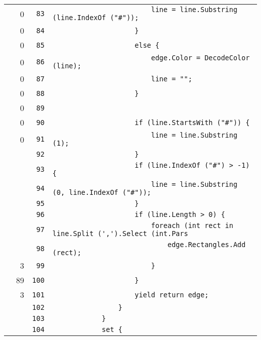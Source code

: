 \documentclass[a4paper,10pt]{article}
\begin{document}
\begin{longtable}[l]{lrrl}
\cellcolor{red} & 0 & \verb~83~ & \verb~                        line = line.Substring (line.IndexOf ("#"));~\\
\cellcolor{red} & 0 & \verb~84~ & \verb~                    }~\\
\cellcolor{red} & 0 & \verb~85~ & \verb~                    else {~\\
\cellcolor{red} & 0 & \verb~86~ & \verb~                        edge.Color = DecodeColor (line);~\\
\cellcolor{red} & 0 & \verb~87~ & \verb~                        line = "";~\\
\cellcolor{red} & 0 & \verb~88~ & \verb~                    }~\\
\cellcolor{red} & 0 & \verb~89~ & \verb~~\\
\cellcolor{red} & 0 & \verb~90~ & \verb~                    if (line.StartsWith ("#")) {~\\
\cellcolor{red} & 0 & \verb~91~ & \verb~                        line = line.Substring (1);~\\
\cellcolor{gray} &  & \verb~92~ & \verb~                    }~\\
\cellcolor{gray} &  & \verb~93~ & \verb~                    if (line.IndexOf ("#") > -1) {~\\
\cellcolor{gray} &  & \verb~94~ & \verb~                        line = line.Substring (0, line.IndexOf ("#"));~\\
\cellcolor{gray} &  & \verb~95~ & \verb~                    }~\\
\cellcolor{gray} &  & \verb~96~ & \verb~                    if (line.Length > 0) {~\\
\cellcolor{gray} &  & \verb~97~ & \verb~                        foreach (int rect in line.Split (',').Select (int.Pars~\\
\cellcolor{gray} &  & \verb~98~ & \verb~                            edge.Rectangles.Add (rect);~\\
\cellcolor{green} & 3 & \verb~99~ & \verb~                        }~\\
\cellcolor{green} & 89 & \verb~100~ & \verb~                    }~\\
\cellcolor{green} & 3 & \verb~101~ & \verb~                    yield return edge;~\\
\cellcolor{gray} &  & \verb~102~ & \verb~                }~\\
\cellcolor{gray} &  & \verb~103~ & \verb~            }~\\
\cellcolor{gray} &  & \verb~104~ & \verb~            set {~\\

\end{longtable}
\end{document}
